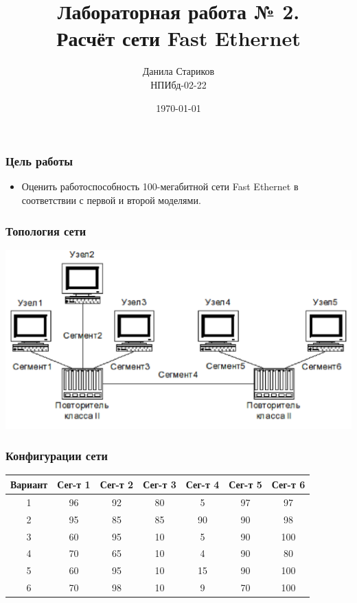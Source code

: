 
\usepackage{multirow}
\usepackage{colortbl}

\title{Лабораторная работа № 2. \\ Расчёт сети Fast Ethernet}
\author{Данила Стариков \\ НПИбд-02-22}
\date{\today}



\frame{\titlepage}

\begin{frame}
\frametitle{Цель работы}
\begin{itemize}
    \item Оценить работоспособность 100-мегабитной сети Fast Ethernet в соответствии
    с первой и второй моделями.
\end{itemize}
\end{frame}

\begin{frame}
\frametitle{Топология сети}
    \centering
        \includegraphics[width=\textwidth]{../images/topology.png}
\end{frame}

\begin{frame}
\frametitle{Конфигурации сети}
    \begin{tabular}{|c|c|c|c|c|c|c|}
    \hline
        Вариант & Сег-т 1 & Сег-т 2 & Сег-т 3 & Сег-т 4 & Сег-т 5 & Сег-т 6 \\ \hline
        1 & 96 & 92 & 80 & 5 & 97 & 97 \\ \hline
        2 & 95 & 85 & 85 & 90 & 90 & 98 \\ \hline
        3 & 60 & 95 & 10 & 5 & 90 & 100 \\ \hline
        4 & 70 & 65 & 10 & 4 & 90 & 80 \\ \hline
        5 & 60 & 95 & 10 & 15 & 90 & 100 \\ \hline
        6 & 70 & 98 & 10 & 9 & 70 & 100 \\ \hline
    \end{tabular}
\end{frame}

